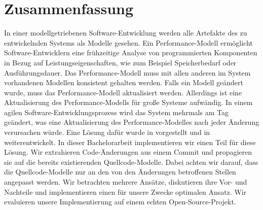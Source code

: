 \chapter{Zusammenfassung}
\label{ch:Zusammenfassung}



In einer modellgetriebenen Software-Entwicklung werden alle Artefakte des zu entwickelnden Systems als Modelle gesehen. Ein Performance-Modell ermöglicht Software-Entwicklern eine frühzeitige Analyse von programmierten Komponenten in Bezug auf Leistungseigenschaften, wie zum Beispiel Speicherbedarf oder Ausführungsdauer. Das Performance-Modell muss mit allen anderen im System vorhandenen Modellen konsistent gehalten werden. Falls ein Modell geändert wurde, muss das Performance-Modell aktualisiert werden. Allerdings ist eine Aktualisierung des Performance-Modells für große Systeme aufwändig. In einem agilen Software-Entwicklungsprozess wird das System mehrmals am Tag geändert, was eine Aktualisierung des Performance-Modelles nach jeder Änderung verursachen würde. Eine Lösung dafür wurde in \cite{mazkatli2018} vorgestellt und in \cite{mazkatli2020} weiterentwickelt. In dieser Bachelorarbeit implementieren wir einen Teil für diese Lösung. Wir extrahieren Code-Änderungen aus einem Commit und propagieren sie auf die bereits existierenden Quellcode-Modelle. Dabei achten wir darauf, dass die Quellcode-Modelle nur an den von den Änderungen betroffenen Stellen angepasst werden. Wir betrachten mehrere Ansätze, diskutieren ihre Vor- und Nachteile und implementieren einen für unsere Zwecke optimalen Ansatz. Wir evaluieren unsere Implementierung auf einem echten Open-Source-Projekt. 

